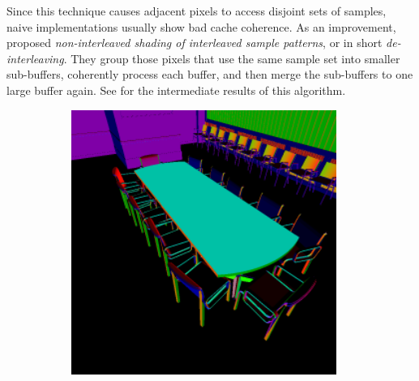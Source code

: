  Since this technique causes adjacent pixels to access disjoint sets of samples, naive implementations usually show bad cache coherence. As an improvement, \citet{segovia2006non} proposed \textit{non-interleaved shading of interleaved sample patterns}, or in short \textit{de-interleaving}. They group those pixels that use the same sample set into smaller sub-buffers, coherently process each buffer, and then merge the sub-buffers to one large buffer again. See  for the intermediate results of this algorithm.


 \begin{figure}[htb]
     \centering
     \begin{subfigure}[b]{0.33\textwidth}
         \centering
         \includegraphics[width=0.95\textwidth]{graphics/interleaved_segovia_1}
         \caption{}
         \label{fig:concept:interleaved_segovia_1}
         \end{subfigure}%
         \begin{subfigure}[b]{0.33\textwidth}
             \centering

\end{subfigure}
\end{figure}
